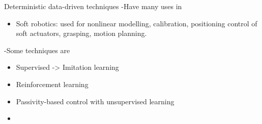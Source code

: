 Deterministic data-driven techniques
-Have many uses in 
\begin{itemize}
    \item Soft robotics: used for nonlinear modelling, calibration, positioning
    control of soft actuators, grasping, motion planning.
\end{itemize}
-Some techniques are 
\begin{itemize}
    \item Supervised -> Imitation learning \cite{reignier1997incremental}
    \item Reinforcement learning
    \item Passivity-based control with unsupervised learning
    \item 
\end{itemize}